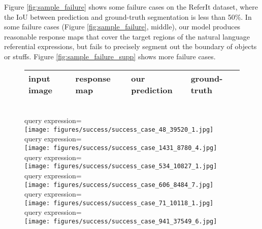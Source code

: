 \documentclass[runningheads]{llncs}
\begin{document}
Figure \ref{fig:sample_failure} shows some failure cases on the ReferIt dataset, where the IoU between prediction and ground-truth segmentation is less than 50\%. In some failure cases (\eg Figure \ref{fig:sample_failure}, middle), our model produces reasonable response maps that cover the target regions of the natural language referential expressions, but fails to precisely segment out the boundary of objects or stuffs. Figure \ref{fig:sample_failure_supp} shows more failure cases.

\begin{figure}
\centering
\begin{tabularx}{0.95\linewidth}{YYYY}
input image & response map & our prediction & ground-truth \\ \hline
\end{tabularx} \\
\small{query expression=} \\
\texttt{[image: figures/success/success\_case\_48\_39520\_1.jpg]} \\
\small{query expression=} \\
\texttt{[image: figures/success/success\_case\_1431\_8780\_4.jpg]} \\
\small{query expression=} \\
\texttt{[image: figures/success/success\_case\_534\_10827\_1.jpg]} \\
\small{query expression=} \\
\texttt{[image: figures/success/success\_case\_606\_8484\_7.jpg]} \\
\small{query expression=} \\
\texttt{[image: figures/success/success\_case\_71\_10118\_1.jpg]} \\
\small{query expression=} \\
\texttt{[image: figures/success/success\_case\_941\_37549\_6.jpg]} \\

\end{figure}
\end{document}

